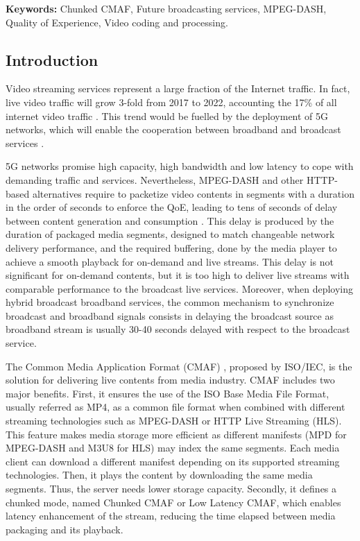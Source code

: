 \textbf{Keywords:} Chunked CMAF, Future broadcasting services, MPEG-DASH, Quality of Experience, Video coding and processing.

\subsection{Introduction}
Video streaming services represent a large fraction of the Internet traffic. In fact, live video traffic will grow 3-fold from 2017 to 2022, accounting the 17\% of all internet video traffic \cite{ciscovideo2017}. This trend would be fuelled by the deployment of 5G networks, which will enable the cooperation between broadband and broadcast services \cite{calabuig2015}.

5G networks promise high capacity, high bandwidth and low latency to cope with demanding traffic and services. Nevertheless, MPEG-DASH and other HTTP-based alternatives require to packetize video contents in segments with a duration in the order of seconds to enforce the QoE, leading to tens of seconds of delay between content generation and consumption \cite{lohmar2011}. This delay is produced by the duration of packaged media segments, designed to match changeable network delivery performance, and the required buffering, done by the media player to achieve a smooth playback for \mbox{on-demand} and live streams. This delay is not significant for \mbox{on-demand} contents, but it is too high to deliver live streams with comparable performance to the broadcast live services. Moreover, when deploying hybrid broadcast broadband services, the common mechanism to synchronize broadcast and broadband signals consists in delaying the broadcast source as broadband stream is usually 30-40 seconds delayed with respect to the broadcast service.

The Common Media Application Format (CMAF) \cite{hughes2017information}, proposed by ISO/IEC, is the solution for delivering live contents from media industry. CMAF includes two major benefits. First, it ensures the use of the ISO Base Media File Format, usually referred as MP4, as a common file format when combined with different streaming technologies such as MPEG-DASH or HTTP Live Streaming (HLS). This feature makes media storage more efficient as different manifests (MPD for MPEG-DASH and M3U8 for HLS) may index the same segments. Each media client can download a different manifest depending on its supported streaming technologies. Then, it plays the content by downloading the same media segments. Thus, the server needs lower storage capacity. Secondly, it defines a chunked mode, named Chunked CMAF or Low Latency CMAF, which enables latency enhancement of the stream, reducing the time elapsed between media packaging and its playback.

